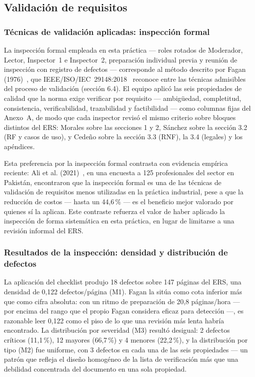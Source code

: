 \documentclass[journal,onecolumn]{IEEEtran}
\begin{document}
	\subsection{Validación de requisitos}
	\label{sec:validacion-teoria}
	
	\subsubsection{Técnicas de validación aplicadas: inspección formal}
	
	La inspección formal empleada en esta práctica --- roles rotados de
	Moderador, Lector, Inspector~1 e Inspector~2, preparación
	individual previa y reunión de inspección con registro de defectos
	--- corresponde al método descrito por Fagan
	(1976)~\cite{fagan1976}, que IEEE/ISO/IEC~29148:2018~\cite{ieee29148_2018}
	reconoce entre las técnicas admisibles del proceso de validación
	(sección 6.4). El equipo aplicó las seis propiedades de calidad
	que la norma exige verificar por requisito --- ambigüedad,
	completitud, consistencia, verificabilidad, trazabilidad y
	factibilidad --- como columnas fijas del Anexo~A, de modo que cada
	inspector revisó el mismo criterio sobre bloques distintos del
	ERS: Morales sobre las secciones 1 y 2, Sánchez sobre la sección
	3.2 (RF y casos de uso), y Cedeño sobre la sección 3.3 (RNF), la
	3.4 (legales) y los apéndices.
	
	Esta preferencia por la inspección formal contrasta con evidencia
	empírica reciente: Ali et al. (2021)~\cite{ali2021}, en una
	encuesta a 125 profesionales del sector en Pakistán, encontraron
	que la inspección formal es una de las técnicas de validación de
	requisitos menos utilizadas en la práctica industrial, pese a que
	la reducción de costos --- hasta un 44,6\,\% --- es el beneficio
	mejor valorado por quienes sí la aplican. Este contraste refuerza
	el valor de haber aplicado la inspección de forma sistemática en
	esta práctica, en lugar de limitarse a una revisión informal del
	ERS.
	
	\subsubsection{Resultados de la inspección: densidad y distribución de defectos}
	
	La aplicación del checklist produjo 18 defectos sobre 147 páginas
	del ERS, una densidad de 0,122 defectos/página (M1). Fagan
	\cite{fagan1976} la sitúa como cota inferior más que como cifra
	absoluta: con un ritmo de preparación de 20,8 páginas/hora --- por
	encima del rango que el propio Fagan considera eficaz para
	detección ---, es razonable leer 0,122 como el piso de lo que una
	revisión más lenta habría encontrado. La distribución por
	severidad (M3) resultó desigual: 2 defectos críticos (11,1\,\%),
	12 mayores (66,7\,\%) y 4 menores (22,2\,\%), y la distribución por
	tipo (M2) fue uniforme, con 3 defectos en cada una de las seis
	propiedades --- un patrón que refleja el diseño homogéneo de la
	lista de verificación más que una debilidad concentrada del
	documento en una sola propiedad.
	
\end{document}

